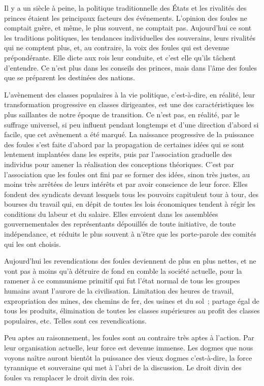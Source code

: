 \documentclass[french,twoside]{book} %
\begin{document}
Il y a un siècle à peine, la politique traditionnelle des États et les rivalités des princes étaient les principaux facteurs des événements. L’opinion des foules ne comp­tait guère, et même, le plus souvent, ne comptait pas. Aujourd’hui ce sont les tradi­tions politiques, les tendances individuelles des souverains, leurs rivalités qui ne comptent plus, et, au contraire, la voix des foules qui est devenue prépondérante. Elle dicte aux rois leur conduite, et c’est elle qu’ils tâchent d’entendre. Ce n’est plus dans les conseils des princes, mais dans l’âme des foules que se préparent les destinées des nations.\par
L’avènement des classes populaires à la vie politique, c’est-à-dire, en réalité, leur transformation progressive en classes dirigeantes, est une des caractéristiques les plus saillantes de notre époque de transition. Ce n’est pas, en réalité, par le suffrage univer­sel, si peu influent pendant longtemps et d’une direction d’abord si facile, que cet avènement a été marqué. La naissance progressive de la puissance des foules s’est faite d’abord par la propagation de certaines idées qui se sont lentement implantées dans les esprits, puis par l’association graduelle des individus pour amener la réalisation des conceptions théoriques. C’est par l’association que les foules ont fini par se former des idées, sinon très justes, au moins très arrêtées de leurs intérêts et par avoir conscience de leur force. Elles fondent des syndicats devant lesquels tous les pouvoirs capitulent tour à tour, des bourses du travail qui, en dépit de toutes les lois économiques tendent à régir les conditions du labeur et du salaire. Elles envoient dans les assemblées gouvernementales des représentants dépouillés de toute initiative, de toute indépendance, et réduits le plus souvent à n’être que les porte-parole des comités qui les ont choisis.\par
Aujourd’hui les revendications des foules deviennent de plus en plus nettes, et ne vont pas à moins qu’à détruire de fond en comble la société actuelle, pour la ramener à ce communisme primitif qui fut l’état normal de tous les groupes humains avant l’aurore de la civilisation. Limitation des heures de travail, expropriation des mines, des chemins de fer, des usines et du sol ; partage égal de tous les produits, élimina­tion de toutes les classes supérieures au profit des classes populaires, etc. Telles sont ces revendications.\par
Peu aptes au raisonnement, les foules sont au con­traire très aptes à l’action. Par leur organisation actuelle, leur force est devenue immense. Les dogmes que nous voyons naître auront bientôt la puissance des vieux dogmes c’est-à-dire, la force tyrannique et souveraine qui met à l’abri de la discussion. Le droit divin des foules va remplacer le droit divin des rois.\par
\end{document}
